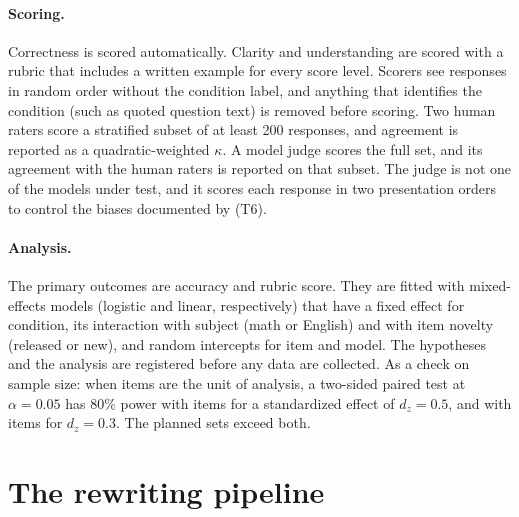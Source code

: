 \documentclass[11pt]{article}
\begin{document}
\paragraph{Scoring.} Correctness is scored automatically. Clarity and understanding are scored with a rubric that includes a written example for every score level. Scorers see responses in random order without the condition label, and anything that identifies the condition (such as quoted question text) is removed before scoring. Two human raters score a stratified subset of at least 200 responses, and agreement is reported as a quadratic-weighted $\kappa$. A model judge scores the full set, and its agreement with the human raters is reported on that subset. The judge is not one of the models under test, and it scores each response in two presentation orders to control the biases documented by \citet{zheng2023judging} (T6).

\paragraph{Analysis.} The primary outcomes are accuracy and rubric score. They are fitted with mixed-effects models (logistic and linear, respectively) that have a fixed effect for condition, its interaction with subject (math or English) and with item novelty (released or new), and random intercepts for item and model. The hypotheses and the analysis are registered before any data are collected. As a check on sample size: when items are the unit of analysis, a two-sided paired test at $\alpha = 0.05$ has 80\% power with \PowerNFive{} items for a standardized effect of $d_z = 0.5$, and with \PowerNThree{} items for $d_z = 0.3$. The planned sets exceed both.

\section{The rewriting pipeline}
\label{sec:application}
\end{document}
